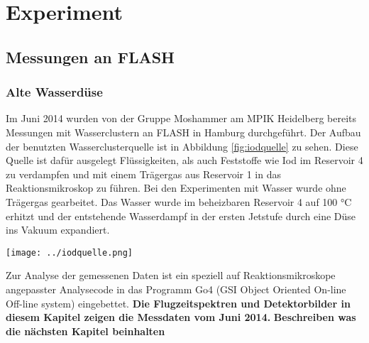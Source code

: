 \chapter{Experiment} 

\section{Messungen an FLASH}

\subsection{Alte Wasserdüse}

Im Juni 2014 wurden von der Gruppe Moshammer am MPIK Heidelberg bereits Messungen mit Wasserclustern an FLASH in Hamburg durchgeführt. Der Aufbau der benutzten Wasserclusterquelle ist in Abbildung \ref{fig:iodquelle} zu sehen. Diese Quelle ist dafür ausgelegt Flüssigkeiten, als auch Feststoffe wie Iod im Reservoir 4 zu verdampfen und mit einem Trägergas aus Reservoir 1 in das Reaktionsmikroskop zu führen. Bei den Experimenten mit Wasser wurde ohne Trägergas gearbeitet. Das Wasser wurde im beheizbaren Reservoir 4 auf 100 °C erhitzt und der entstehende Wasserdampf in der ersten Jetstufe durch eine Düse ins Vakuum expandiert.

\begin{center}
\begin{minipage}{\linewidth}
\centering
\texttt{[image: ../iodquelle.png]}%
 \label{fig:iodquelle}
\end{minipage} 
\end{center} 

Zur Analyse der gemessenen Daten ist ein speziell auf Reaktionsmikroskope angepasster Analysecode in das Programm Go4 (GSI Object Oriented On-line Off-line system) eingebettet. \textbf{Die Flugzeitspektren und Detektorbilder in diesem Kapitel zeigen die Messdaten vom Juni 2014.}
\textbf{Beschreiben was die nächsten Kapitel beinhalten}

